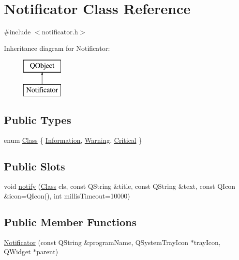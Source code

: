 \hypertarget{class_notificator}{}\section{Notificator Class Reference}
\label{class_notificator}


{\ttfamily \#include $<$notificator.\+h$>$}

Inheritance diagram for Notificator\+:\begin{figure}[H]
\begin{center}
\leavevmode
\includegraphics[height=2.000000cm]{class_notificator}
\end{center}
\end{figure}
\subsection*{Public Types}
\begin{DoxyCompactItemize}
\item 
enum \mbox{\hyperlink{class_notificator_aa2ff8a05d471e32e77584a2b8dd182ab}{Class}} \{ \mbox{\hyperlink{class_notificator_aa2ff8a05d471e32e77584a2b8dd182aba195b01e918cc724c6ad65f5037e85f83}{Information}}, 
\mbox{\hyperlink{class_notificator_aa2ff8a05d471e32e77584a2b8dd182abac33ad19811d3b1d6b57305dd75d63a5e}{Warning}}, 
\mbox{\hyperlink{class_notificator_aa2ff8a05d471e32e77584a2b8dd182aba596518f9cfdbd57b0fdc68fc95c69ecd}{Critical}}
 \}
\end{DoxyCompactItemize}
\subsection*{Public Slots}
\begin{DoxyCompactItemize}
\item 
void \mbox{\hyperlink{class_notificator_ae08e1e7e85ddc4690f307649021f7fdc}{notify}} (\mbox{\hyperlink{class_notificator_aa2ff8a05d471e32e77584a2b8dd182ab}{Class}} cls, const Q\+String \&title, const Q\+String \&text, const Q\+Icon \&icon=Q\+Icon(), int millis\+Timeout=10000)
\end{DoxyCompactItemize}
\subsection*{Public Member Functions}
\begin{DoxyCompactItemize}
\item 
\mbox{\hyperlink{class_notificator_ac98c8b73d4e06ea85e9f58426c5c935d}{Notificator}} (const Q\+String \&program\+Name, Q\+System\+Tray\+Icon $\ast$tray\+Icon, Q\+Widget $\ast$parent)
\end{DoxyCompactItemize}


